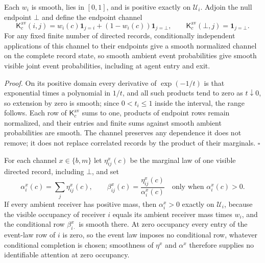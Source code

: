 Each \(w_i\) is smooth, lies in \([0,1]\), and is positive exactly on
\(\mathcal U_i\). Adjoin the null endpoint \(\bot\) and define the endpoint channel
\begin{equation}
 \mathsf K^{\mathrm{av}}_c(i,j)=w_i(c)\mathbf1_{j=i}+(1-w_i(c))\mathbf1_{j=\bot},
 \qquad \mathsf K^{\mathrm{av}}_c(\bot,j)=\mathbf1_{j=\bot}.
\label{eq:rg-cover-availability-channel}
\end{equation}
For any fixed finite number of directed records, conditionally independent
applications of this channel to their endpoints give a smooth normalized channel
on the complete record state, so smooth ambient event probabilities give smooth
visible joint event probabilities, including at agent entry and exit.

\noindent\emph{Proof.}
On its positive domain every derivative of \(\exp(-1/t)\) is that exponential
times a polynomial in \(1/t\), and all such products tend to zero as
\(t\downarrow0\), so extension by zero is smooth; since \(0<t_i\leq1\) inside the
interval, the range follows. Each row of \(\mathsf K^{\mathrm{av}}_c\) sums to one,
products of endpoint rows remain normalized, and their entries and finite sums
against smooth ambient probabilities are smooth. The channel preserves any
dependence it does not remove; it does not replace correlated records by the
product of their marginals. \(\square\)

For each channel \(x\in\{b,m\}\) let \(\eta^x_{ij}(c)\) be the marginal law of one
visible directed record, including \(\bot\), and set
\begin{equation}
 \alpha_i^x(c)=\sum_j\eta^x_{ij}(c),\qquad
 \beta^x_{ij}(c)=\frac{\eta^x_{ij}(c)}{\alpha_i^x(c)}
 \quad\text{only when }\alpha_i^x(c)>0.
\label{eq:rg-cover-conditional-attention}
\end{equation}
If every ambient receiver has positive mass, then \(\alpha_i^x>0\) exactly on
\(\mathcal U_i\), because the visible occupancy of receiver \(i\) equals its
ambient receiver mass times \(w_i\), and the conditional row \(\beta^x_{i\cdot}\)
is smooth there. At zero occupancy every entry of the event-law row of \(i\) is
zero, so the event law imposes no conditional row, whatever conditional
completion is chosen; smoothness of \(\eta^x\) and \(\alpha^x\) therefore
supplies no identifiable attention at zero occupancy. 

